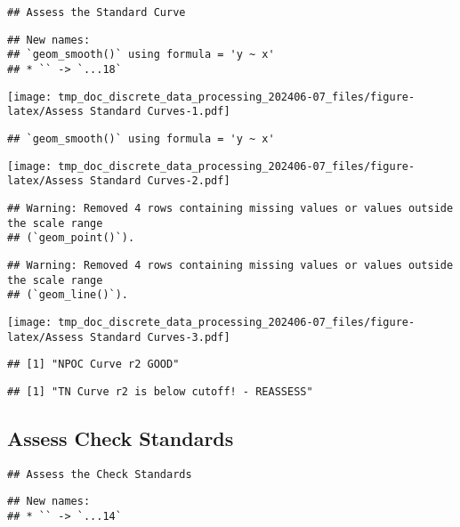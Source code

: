 \documentclass[
]{article}
\begin{document}
\begin{verbatim}
## Assess the Standard Curve
\end{verbatim}

\begin{verbatim}
## New names:
## `geom_smooth()` using formula = 'y ~ x'
## * `` -> `...18`
\end{verbatim}

\texttt{[image: tmp\_doc\_discrete\_data\_processing\_202406-07\_files/figure-latex/Assess Standard Curves-1.pdf]}

\begin{verbatim}
## `geom_smooth()` using formula = 'y ~ x'
\end{verbatim}

\texttt{[image: tmp\_doc\_discrete\_data\_processing\_202406-07\_files/figure-latex/Assess Standard Curves-2.pdf]}

\begin{verbatim}
## Warning: Removed 4 rows containing missing values or values outside the scale range
## (`geom_point()`).
\end{verbatim}

\begin{verbatim}
## Warning: Removed 4 rows containing missing values or values outside the scale range
## (`geom_line()`).
\end{verbatim}

\texttt{[image: tmp\_doc\_discrete\_data\_processing\_202406-07\_files/figure-latex/Assess Standard Curves-3.pdf]}

\begin{verbatim}
## [1] "NPOC Curve r2 GOOD"
\end{verbatim}

\begin{verbatim}
## [1] "TN Curve r2 is below cutoff! - REASSESS"
\end{verbatim}

\newpage

\hypertarget{assess-check-standards}{%
\subsection{Assess Check Standards}\label{assess-check-standards}}

\begin{verbatim}
## Assess the Check Standards
\end{verbatim}

\begin{verbatim}
## New names:
## * `` -> `...14`
\end{verbatim}
\end{document}
